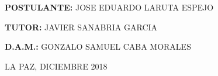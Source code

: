 \begin{titlepage}
\begin{center}
    \vspace*{0.2in}
    
    \begin{large}
    \textbf{POSTULANTE:} JOSE EDUARDO LARUTA ESPEJO\\
    \end{large}
    
    \begin{large}
    \hspace{0.08in} \textbf{TUTOR:} JAVIER SANABRIA GARCIA\\
    \end{large}
    
    \begin{large}
    \hspace{0.44in} \textbf{D.A.M.:} GONZALO SAMUEL CABA MORALES\\
    \end{large}
    
    \vspace*{0.2in}
    
    \begin{normalsize}
    LA PAZ, DICIEMBRE 2018\\
    \end{normalsize}
    \end{center}
    \end{titlepage}
    
    
    \thispagestyle{empty}
